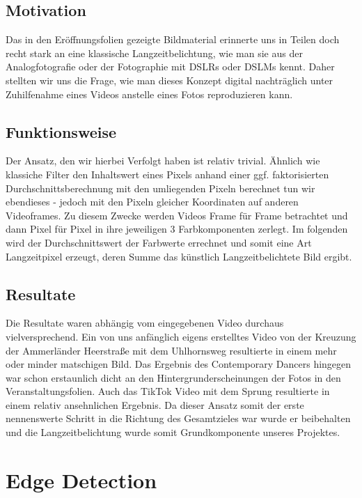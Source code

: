 \documentclass[12pt]{scrartcl}
\begin{document}
\subsection{Motivation}Das in den Er\"offnungsfolien gezeigte Bildmaterial erinnerte uns in Teilen doch recht stark an eine klassische
Langzeitbelichtung, wie
man sie aus der Analogfotografie oder der Fotographie mit DSLRs oder DSLMs kennt. Daher stellten wir uns die Frage, wie man dieses Konzept digital nachtr\"aglich unter Zuhilfenahme eines Videos anstelle eines Fotos reproduzieren kann. \\
\subsection{Funktionsweise}Der Ansatz, den wir hierbei Verfolgt haben ist relativ trivial. \"Ahnlich wie klassiche Filter den
Inhaltswert eines Pixels anhand einer ggf. faktorisierten Durchschnittsberechnung mit den umliegenden Pixeln berechnet tun wir ebendieses - jedoch mit den Pixeln gleicher Koordinaten auf anderen Videoframes. Zu diesem Zwecke werden Videos Frame f\"ur Frame betrachtet und dann Pixel f\"ur Pixel in ihre jeweiligen 3 Farbkomponenten zerlegt. Im folgenden wird der Durchschnittswert der Farbwerte errechnet und somit eine Art Langzeitpixel erzeugt, deren Summe das k\"unstlich Langzeitbelichtete Bild ergibt.
 \subsection{Resultate}Die Resultate waren abh\"angig vom eingegebenen Video durchaus vielversprechend. Ein von uns anf\"anglich eigens erstelltes Video von der Kreuzung der Ammerl\"ander Heerstra{\ss}e mit dem Uhlhornsweg resultierte in einem mehr oder minder matschigen Bild. Das Ergebnis des Contemporary Dancers hingegen war schon erstaunlich dicht an den Hintergrunderscheinungen der Fotos in den Veranstaltungsfolien. Auch das TikTok Video mit dem Sprung resultierte in einem relativ ansehnlichen Ergebnis. Da dieser Ansatz somit der erste nennenswerte Schritt in die Richtung des Gesamtzieles war wurde er beibehalten und die Langzeitbelichtung
wurde somit Grundkomponente unseres Projektes.


\section{Edge Detection}
\end{document}
